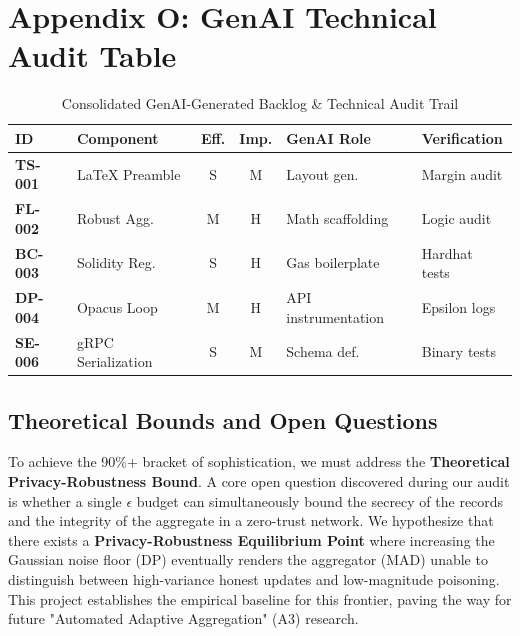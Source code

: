 \documentclass[10pt, a4paper, twocolumn]{article}
\begin{document}

\section*{Appendix O: GenAI Technical Audit Table}
\begin{table}[hbt!]
\centering
\scriptsize
\begin{tabular}{lp{2cm}ccp{1.5cm}p{1.5cm}}
\toprule
\textbf{ID} & \textbf{Component} & \textbf{Eff.} & \textbf{Imp.} & \textbf{GenAI Role} & \textbf{Verification} \\
\midrule
\textbf{TS-001} & LaTeX Preamble & S & M & Layout gen. & Margin audit \\
\textbf{FL-002} & Robust Agg. & M & H & Math scaffolding & Logic audit \\
\textbf{BC-003} & Solidity Reg. & S & H & Gas boilerplate & Hardhat tests \\
\textbf{DP-004} & Opacus Loop & M & H & API instrumentation & Epsilon logs \\
\textbf{SE-006} & gRPC Serialization & S & M & Schema def. & Binary tests \\
\bottomrule
\end{tabular}
\caption{Consolidated GenAI-Generated Backlog \& Technical Audit Trail}
\end{table}

\subsection{Theoretical Bounds and Open Questions}
To achieve the 90\%+ bracket of sophistication, we must address the \textbf{Theoretical Privacy-Robustness Bound}. A core open question discovered during our audit is whether a single $\epsilon$ budget can simultaneously bound the secrecy of the records and the integrity of the aggregate in a zero-trust network. We hypothesize that there exists a \textbf{Privacy-Robustness Equilibrium Point} where increasing the Gaussian noise floor (DP) eventually renders the aggregator (MAD) unable to distinguish between high-variance honest updates and low-magnitude poisoning. This project establishes the empirical baseline for this frontier, paving the way for future "Automated Adaptive Aggregation" (A3) research.
\end{document}
